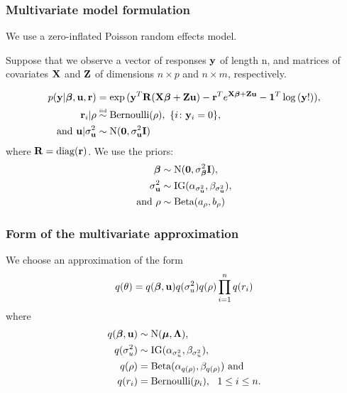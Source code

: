 \documentclass{beamer}
\begin{document}
\begin{frame}
	\frametitle{Multivariate model formulation}
	We use a zero-inflated Poisson random effects model.
	
	\medskip
	
	Suppose that we observe a vector of responses ${\bf y}$ of length n, and matrices
	of covariates ${\bf X}$ and ${\bf Z}$ of dimensions $n \times p$ and $n \times m$,
	respectively.
	
	\begin{align*}
		p({\bf y}|{\boldsymbol \beta}, {\bf u}, {\bf r})       & = \exp{({\bf y}^T{\bf R}({\bf X}{\boldsymbol\beta}+ {\bf Z}{\bf u}) - {\bf r}^Te^{{\bf X}{\boldsymbol\beta}+ {\bf Z}{\bf u}} - {\bf1}^T\log{({\bf y}!)})}, \\
		{\bf r}_i|\rho                    & \stackrel{\mbox{\tiny iid}}{\sim} \text{Bernoulli}(\rho), \ \{i \colon {\bf y}_i=0\},                \\
		\text{and }{\bf u}|\sigma_{{\bf u}}^2 & \sim \text{N}({\bf 0}, \sigma_{{\bf u}}^2 {\bf I})                                                             \\
	\end{align*}
	\noindent where ${\bf R} =\mbox{diag}({\bf r})$.
	We use the priors:
	\begin{align*}
		{\boldsymbol\beta}          & \sim \text{N}({\bf 0}, \sigma_{\boldsymbol \beta}^2{\bf I}),                  \\
		\sigma_{\bf u}^2    & \sim \text{IG}(\alpha_{\sigma_{\bf u}^2}, \beta_{\sigma_{\bf u}^2}), \\
		\text{and }\rho & \sim \text{Beta}(a_\rho, b_\rho)                             \\
	\end{align*}
\end{frame}

\begin{frame}
	\frametitle{Form of the multivariate approximation}
	We choose an approximation of the form
	$$
	q(\theta) = q({\boldsymbol \beta}, {\bf u}) q(\sigma_u^2) q(\rho) \prod_{i=1}^n q(r_i)
	$$
	where
	\begin{align*}
		q({\boldsymbol \beta}, {\bf u}) & \sim \text{N}({\boldsymbol \mu}, {\boldsymbol \Lambda}),                               \\
		q(\sigma_u^2)  & \sim \text{IG}(\alpha_{\sigma_u^2}, \beta_{\sigma_u^2}),     \\
		q(\rho)        & = \text{Beta}(\alpha_{q(\rho)}, \beta_{q(\rho)}) \text{ and} \\
		q(r_i)         & = \text{Bernoulli}(p_i), \ \ 1 \leq i \leq n.                
	\end{align*}
\end{frame}
\end{document}
